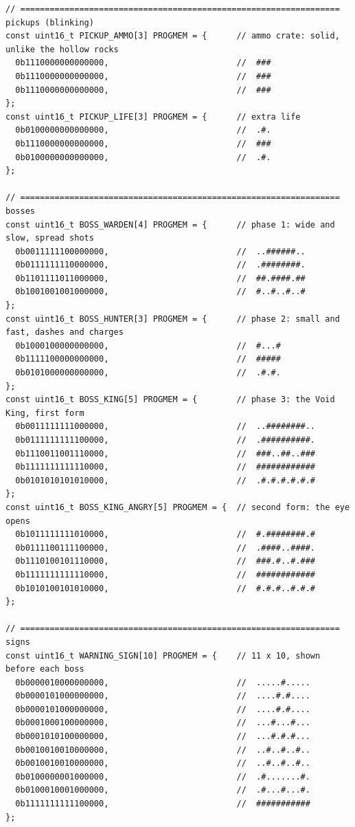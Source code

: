 \documentclass[11pt,a4paper]{article}
\begin{document}
\begin{latin}
\begin{lstlisting}[language=Arduino]
// ================================================================= pickups (blinking)
const uint16_t PICKUP_AMMO[3] PROGMEM = {      // ammo crate: solid, unlike the hollow rocks
  0b1110000000000000,                          //  ###
  0b1110000000000000,                          //  ###
  0b1110000000000000,                          //  ###
};
const uint16_t PICKUP_LIFE[3] PROGMEM = {      // extra life
  0b0100000000000000,                          //  .#.
  0b1110000000000000,                          //  ###
  0b0100000000000000,                          //  .#.
};

// ================================================================= bosses
const uint16_t BOSS_WARDEN[4] PROGMEM = {      // phase 1: wide and slow, spread shots
  0b0011111100000000,                          //  ..######..
  0b0111111110000000,                          //  .########.
  0b1101111011000000,                          //  ##.####.##
  0b1001001001000000,                          //  #..#..#..#
};
const uint16_t BOSS_HUNTER[3] PROGMEM = {      // phase 2: small and fast, dashes and charges
  0b1000100000000000,                          //  #...#
  0b1111100000000000,                          //  #####
  0b0101000000000000,                          //  .#.#.
};
const uint16_t BOSS_KING[5] PROGMEM = {        // phase 3: the Void King, first form
  0b0011111111000000,                          //  ..########..
  0b0111111111100000,                          //  .##########.
  0b1110011001110000,                          //  ###..##..###
  0b1111111111110000,                          //  ############
  0b0101010101010000,                          //  .#.#.#.#.#.#
};
const uint16_t BOSS_KING_ANGRY[5] PROGMEM = {  // second form: the eye opens
  0b1011111111010000,                          //  #.########.#
  0b0111100111100000,                          //  .####..####.
  0b1110100101110000,                          //  ###.#..#.###
  0b1111111111110000,                          //  ############
  0b1010100101010000,                          //  #.#.#..#.#.#
};

// ================================================================= signs
const uint16_t WARNING_SIGN[10] PROGMEM = {    // 11 x 10, shown before each boss
  0b0000010000000000,                          //  .....#.....
  0b0000101000000000,                          //  ....#.#....
  0b0000101000000000,                          //  ....#.#....
  0b0001000100000000,                          //  ...#...#...
  0b0001010100000000,                          //  ...#.#.#...
  0b0010010010000000,                          //  ..#..#..#..
  0b0010010010000000,                          //  ..#..#..#..
  0b0100000001000000,                          //  .#.......#.
  0b0100010001000000,                          //  .#...#...#.
  0b1111111111100000,                          //  ###########
};


\end{lstlisting}
\end{latin}
\end{document}
